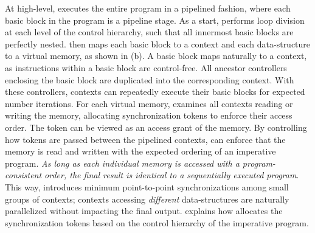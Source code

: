 At high-level, \name executes the entire program in a pipelined fashion, where each basic block
in the program is a pipeline stage.
As a start, \name performs loop division at each level of the control hierarchy, such that all
innermost basic blocks are perfectly nested. \name then maps each basic block to a context and each
data-structure to a virtual memory, as shown in  (b).
A basic block maps naturally to a context, as instructions within a basic block are control-free. 
All ancestor controllers enclosing the basic block are duplicated into the corresponding context.
With these controllers, contexts can repeatedly execute their basic blocks for expected number iterations. 
For each virtual memory, \name examines all contexts reading or writing the memory,
allocating synchronization tokens to enforce their access order.
The token can be viewed as an access grant of the memory.
By controlling how tokens are passed between the pipelined contexts, \name can enforce that the memory is read and written with the expected ordering of an imperative program.
\emph{As long as each individual memory is accessed with a program-consistent
order, the final result is identical to a sequentially executed program}.
This way, \name introduces minimum point-to-point synchronizations among small groups of contexts; contexts
accessing \emph{different} data-structures are naturally parallelized without impacting the final output.
 explains how \name allocates the synchronization tokens based on the control
hierarchy of the imperative program.

